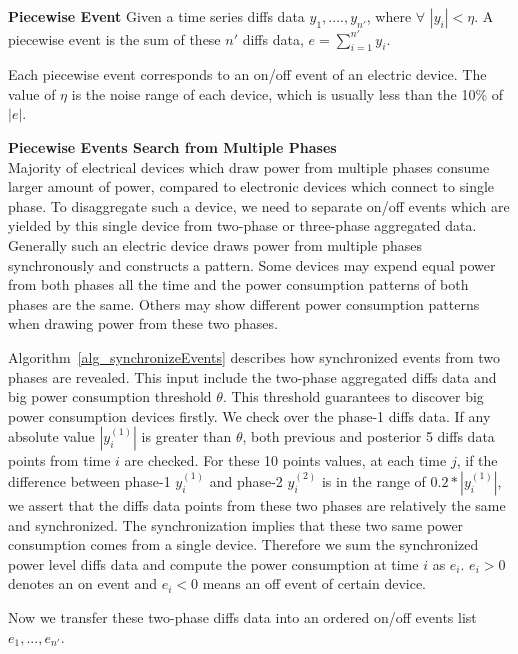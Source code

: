 \begin{definition}{\textbf{Piecewise Event}}
Given a time series diffs data $y_1, ...., y_{n'}$, where $\forall$ $|y_i| < \eta$. 
A piecewise event is the sum of these $n'$ diffs data, $e= \sum_{i=1}^{n'} y_i$. 
\end{definition}
Each piecewise event corresponds to an on/off event of an electric device. 
The value of $\eta$ is the noise range of each device, 
which is usually less than the 10\% of $|e|$.  

\textbf{Piecewise Events Search from Multiple Phases} \\
Majority of electrical devices which draw power from multiple phases consume larger amount of power, compared to 
electronic devices which connect to single phase. 
To disaggregate such a device, we need to separate on/off events which are yielded by this single device from two-phase or three-phase aggregated data. 
Generally such an electric device draws power from multiple phases synchronously 
and constructs a  pattern. 
Some devices may expend equal power from both phases all the time and the power consumption patterns of both phases are the same.
Others may show different power consumption patterns when drawing power from these two phases. 

Algorithm~\ref{alg_synchronizeEvents} describes how synchronized events from two phases are revealed.  
This input include the two-phase aggregated diffs data and big power consumption threshold $\theta$. 
This threshold guarantees to discover big power consumption devices firstly. 
We check over the phase-1 diffs data. 
If any absolute value $|y_i^{(1)}|$ is greater than $\theta$, 
both previous and posterior 5 diffs data points from time $i$ are checked. 
For these 10 points values, 
at each time $j$, if the difference between phase-1 $y_i^{(1)}$ and phase-2 $y_i^{(2)}$ is in the range of $0.2*|y_i^{(1)}|$,  
we assert that the diffs data points from these two phases are relatively the same and synchronized. 
The synchronization implies that 
these two same power consumption comes from a single device. 
Therefore we sum the synchronized power level diffs data and compute the power consumption at time $i$ as $e_i$.  
$e_i>0$ denotes an on event and $e_i<0$ means an off event of certain device.

Now we transfer these two-phase diffs data into 
an ordered on/off events list $e_1, ..., e_{n'}$.


